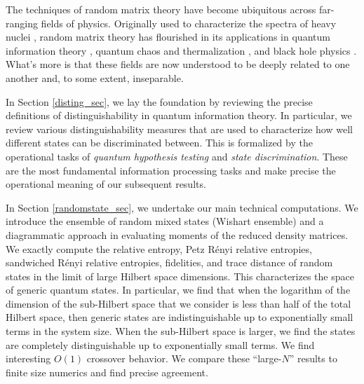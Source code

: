 \documentclass[a4paper,11pt]{article}
\newcommand*{\JKF}[1]{\textcolor{blue}{[JKF: #1]}}
\newcommand*{\SR}[1]{\textcolor{magenta}{[SR: \textsf{#1}]}}
\begin{document}
The techniques of random matrix theory have become ubiquitous across far-ranging fields of physics. Originally used to characterize the spectra of heavy nuclei \cite{10.2307/1970079}, random matrix theory has flourished in its applications in quantum information theory \cite{2016JMP....57a5215C}, quantum chaos and thermalization \cite{2016AdPhy..65..239D}, and black hole physics \cite{1993PhRvL..71.3743P,2007JHEP...09..120H}. What's more is that these fields are now understood to be deeply related to one another and, to some extent, inseparable. 

In Section \ref{disting_sec}, we lay the foundation by reviewing the precise definitions of distinguishability in quantum information theory. In particular, we review various distinguishability measures that are used to characterize how well different states can be discriminated between. This is formalized by the operational tasks of \textit{quantum hypothesis testing} and \textit{state discrimination}. These are the most fundamental information processing tasks and make precise the operational meaning of our subsequent results.

In Section \ref{randomstate_sec}, we undertake our main technical computations. We introduce the ensemble of random mixed states (Wishart ensemble) and a diagrammatic approach in evaluating moments of the reduced density matrices. We exactly compute the relative entropy, Petz R\'enyi relative entropies, sandwiched R\'enyi relative entropies, 
fidelities, and trace distance of random states in the limit of large Hilbert space dimensions. This characterizes the space of generic quantum states. In particular, we find that when the logarithm of the dimension of the sub-Hilbert space that we consider is less than half of the total Hilbert space, then generic states are indistinguishable up to exponentially small terms in the system size. When the sub-Hilbert space is larger, we find the states are completely distinguishable up to exponentially small terms. We find interesting $O(1)$ crossover behavior. We compare these ``large-$N$'' results to finite size numerics and find precise agreement.
\end{document}
